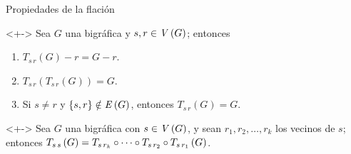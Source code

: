\documentclass[spanish]{beamer}
\begin{document}
\begin{frame}{Propiedades de la flación}
  \begin{lemma}<+-> Sea $G$ una bigráfica y $s, r \in \mathit{V}\left({G}\right)$; entonces
    \begin{enumerate}[<+->]
      \item $T_{s\,r}\left(G\right) - r = G - r$.
      \item $T_{s\,r}\left(T_{s\,r}\left(G\right)\right) = G$.
      \item Si $s \ne r$ y $\left\{{s, r}\right\} \notin \mathit{E}\left({G}\right)$, entonces 
      $T_{s \, r}\left( G \right) = G$.
    \end{enumerate}
  \end{lemma}
  \begin{lemma}<+->
    Sea $G$ una bigráfica con $s \in \mathit{V}\left({G}\right)$, y sean $r_1, r_2, \ldots, 
    r_k$ los vecinos de $s$; entonces $T_{{{s}}\,{{s}}}\left({G}\right) = T_{{s}\,{r_k}} 
    \circ \cdots \circ T_{{s}\,{r_2}}\circ T_{{{s}}\,{{r_1}}}\left({G}\right)$.
  \end{lemma}
\end{frame}
\end{document}
